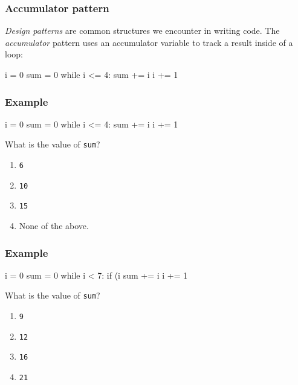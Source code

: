 \documentclass[11pt]{beamer}
\begin{document}
\begin{frame}[fragile]
  \frametitle{Accumulator pattern}
  \Enlarge

  \begin{itemize}
  \myitem  \emph{Design patterns} are common structures we encounter in writing code. %
  \myitem  The \emph{accumulator} pattern uses an accumulator variable to track a result inside of a loop: %
  \begin{semiverbatim}
i = 0
sum = 0
while i <= 4:
    sum += i
    i += 1
  \end{semiverbatim}
  \end{itemize}
\end{frame}

\begin{frame}[fragile]
  \frametitle{Example}
  \Enlarge

  \begin{semiverbatim}
i = 0
sum = 0
while i <= 4:
    sum += i
    i += 1
  \end{semiverbatim}
  What is the value of \texttt{sum}?
  \begin{enumerate}[label=\Alph*]
  \item  \texttt{6}
  \item  \texttt{10}
  \item  \texttt{15}
  \item  None of the above.
  \end{enumerate}
\end{frame}

\begin{frame}[fragile]
  \frametitle{Example}
  \Enlarge

  \begin{semiverbatim}
i = 0
sum = 0
while i < 7:
    if (i %
        sum += i
    i += 1
  \end{semiverbatim}
  What is the value of \texttt{sum}?
  \begin{enumerate}[label=\Alph*]
  \item  \texttt{9} %
  \item  \texttt{12}
  \item  \texttt{16}
  \item  \texttt{21}
  \end{enumerate}
\end{frame}
\end{document}
